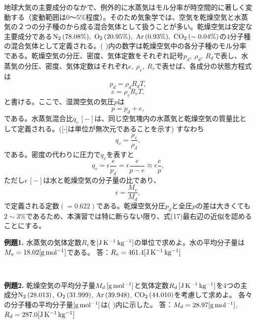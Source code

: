 \documentclass{jsarticle}
\begin{document}
地球大気の主要成分のなかで、例外的に水蒸気はモル分率が時空間的に著しく変動する（変動範囲は0～5\%程度）。そのため気象学では、空気を乾燥空気と水蒸気の２つの分子種のから成る混合気体として扱うことが多い。乾燥空気は安定な主要成分である$\rm{N_{2}}\,(78.08\%),\ \rm{O_{2}}\,(20.95\%),\ \rm{Ar}\,(0.93\%),\ \rm{CO_{2}}\,(\sim0.04\%)$の4分子種の混合気体として定義される。( )内の数字は乾燥空気中の各分子種のモル分率である。乾燥空気の分圧、密度、気体定数をそれぞれ記号$p_{d},\ \rho_{d},\ R_{d}$で表し、水蒸気の分圧、密度、気体定数はそれぞれ$e,\ \rho_{v},\ R_{v}$で表せば、各成分の状態方程式は
\begin{equation}
 p_{d}=\rho_{d}R_{d}T,
\end{equation}
\begin{equation}
 e=\rho_{v}R_{v}T,
\end{equation}
と書ける。ここで、湿潤空気の気圧$p$は
\begin{equation}
 p=p_{d}+e,
\end{equation}
である。水蒸気混合比$q_{v}\,[-]$は、同じ空気塊内の水蒸気と乾燥空気の質量比として定義される。([-]は単位が無次元であることを示す) すなわち
\begin{equation}
 q_{v}=\frac{\rho_{v}}{\rho_{d}},
\end{equation}
である。密度の代わりに圧力で$q_{v}$を表すと
\begin{equation}
 q_{v}=\epsilon\frac{e}{p_{d}}=\epsilon\frac{e}{p-e}\approx\epsilon\frac{e}{p},
\end{equation}
ただし$\epsilon\,[-]$は水と乾燥空気の分子量の比であり、
\begin{equation}
 \epsilon=\frac{M_{v}}{M_{d}},
\end{equation}
で定義される定数$(= 0.622)$である。乾燥空気分圧$p_{d}$と全圧$p$の差は大きくても$2 \sim 3\%$であるため、本演習では特に断らない限り、式(17)最右辺の近似を認めることにする。
\\
\begin{itembox}[l]{\bf{例題1.}}
水蒸気の気体定数$R_{v}$を$[\rm{J\,K^{-1}\,kg^{-1}}]$の単位で求めよ。水の平均分子量は$M_{v}=18.02[\rm{g\,mol^{-1}}]$である。
答：$R_{v}=461.4[\rm{J\,K^{-1}\,kg^{-1}}]$
\end{itembox}
\\
\begin{itembox}[l]{\bf{例題2.}}
乾燥空気の平均分子量$M_{d}\,\rm{[g\,mol^{-1}]}$と気体定数$R_{d}\,\rm{[J\,K^{-1}\,kg^{-1}]}$を4つの主成分$\rm{N_{2}\,(28.013)}$, $\rm{O_{2}\,(31.999)}$, $\rm{Ar \,(39.948)}$, $\rm{CO_{2}\,(44.010)}$を考慮して求めよ。 各々の分子種の平均分子量$\rm{[g\,mol^{-1}]}$は( )内に示した。
答：$M_{d}=28.97[\rm{g\,mol^{-1}}]$, $R_{d}=287.0[\rm{J\,K^{-1}\,kg^{-1}}]$
\end{itembox}
\\
\\
\end{document}
